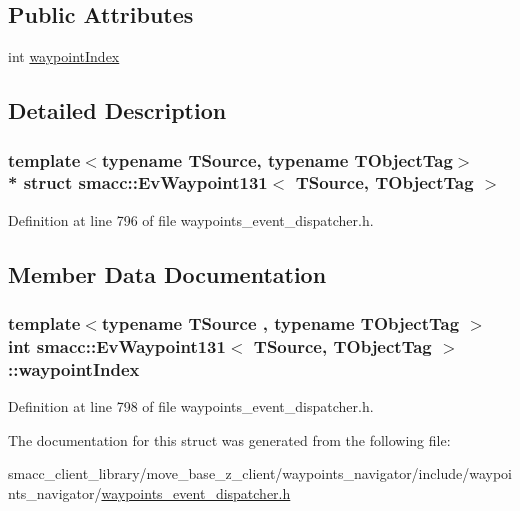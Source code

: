\subsection*{Public Attributes}
\begin{DoxyCompactItemize}
\item 
int \hyperlink{structsmacc_1_1EvWaypoint131_ac25dc2342916ff0ea92e9c033c187a3e}{waypoint\+Index}
\end{DoxyCompactItemize}


\subsection{Detailed Description}
\subsubsection*{template$<$typename T\+Source, typename T\+Object\+Tag$>$\\*
struct smacc\+::\+Ev\+Waypoint131$<$ T\+Source, T\+Object\+Tag $>$}



Definition at line 796 of file waypoints\+\_\+event\+\_\+dispatcher.\+h.



\subsection{Member Data Documentation}
\subsubsection[{\texorpdfstring{waypoint\+Index}{waypointIndex}}]{\setlength{\rightskip}{0pt plus 5cm}template$<$typename T\+Source , typename T\+Object\+Tag $>$ int {\bf smacc\+::\+Ev\+Waypoint131}$<$ T\+Source, T\+Object\+Tag $>$\+::waypoint\+Index}\hypertarget{structsmacc_1_1EvWaypoint131_ac25dc2342916ff0ea92e9c033c187a3e}{}\label{structsmacc_1_1EvWaypoint131_ac25dc2342916ff0ea92e9c033c187a3e}


Definition at line 798 of file waypoints\+\_\+event\+\_\+dispatcher.\+h.



The documentation for this struct was generated from the following file\+:\begin{DoxyCompactItemize}
\item 
smacc\+\_\+client\+\_\+library/move\+\_\+base\+\_\+z\+\_\+client/waypoints\+\_\+navigator/include/waypoints\+\_\+navigator/\hyperlink{waypoints__event__dispatcher_8h}{waypoints\+\_\+event\+\_\+dispatcher.\+h}\end{DoxyCompactItemize}
